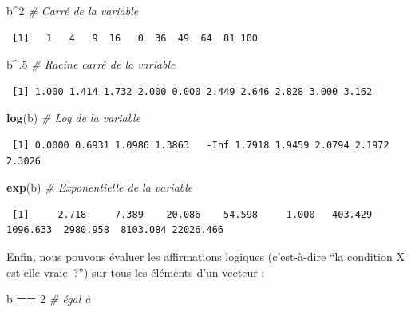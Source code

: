 \documentclass[12pt,]{book}
\newenvironment{Shaded}{\begin{snugshade}}{\end{snugshade}}
\newcommand{\CommentTok}[1]{\textcolor[rgb]{0.56,0.35,0.01}{\textit{#1}}}
\newcommand{\DecValTok}[1]{\textcolor[rgb]{0.00,0.00,0.81}{#1}}
\newcommand{\KeywordTok}[1]{\textcolor[rgb]{0.13,0.29,0.53}{\textbf{#1}}}
\newcommand{\NormalTok}[1]{#1}
\newcommand{\OperatorTok}[1]{\textcolor[rgb]{0.81,0.36,0.00}{\textbf{#1}}}
\newcommand{\StringTok}[1]{\textcolor[rgb]{0.31,0.60,0.02}{#1}}
\begin{document}
\begin{Shaded}
\begin{Highlighting}[]
\NormalTok{b}\OperatorTok{^}\DecValTok{2}               \CommentTok{# Carré de la variable}
\end{Highlighting}
\end{Shaded}

\begin{verbatim}
 [1]   1   4   9  16   0  36  49  64  81 100
\end{verbatim}

\begin{Shaded}
\begin{Highlighting}[]
\NormalTok{b}\OperatorTok{^}\NormalTok{.}\DecValTok{5}              \CommentTok{# Racine carré de la variable}
\end{Highlighting}
\end{Shaded}

\begin{verbatim}
 [1] 1.000 1.414 1.732 2.000 0.000 2.449 2.646 2.828 3.000 3.162
\end{verbatim}

\begin{Shaded}
\begin{Highlighting}[]
\KeywordTok{log}\NormalTok{(b)            }\CommentTok{# Log de la variable}
\end{Highlighting}
\end{Shaded}

\begin{verbatim}
 [1] 0.0000 0.6931 1.0986 1.3863   -Inf 1.7918 1.9459 2.0794 2.1972 2.3026
\end{verbatim}

\begin{Shaded}
\begin{Highlighting}[]
\KeywordTok{exp}\NormalTok{(b)            }\CommentTok{# Exponentielle de la variable}
\end{Highlighting}
\end{Shaded}

\begin{verbatim}
 [1]     2.718     7.389    20.086    54.598     1.000   403.429  1096.633  2980.958  8103.084 22026.466
\end{verbatim}

Enfin, nous pouvons évaluer les affirmations logiques (c'est-à-dire ``la condition X est-elle vraie~?'') sur tous les éléments d'un vecteur :

\begin{Shaded}
\begin{Highlighting}[]
\NormalTok{b }\OperatorTok{==}\StringTok{ }\DecValTok{2}                     \CommentTok{# égal à}
\end{Highlighting}
\end{Shaded}
\end{document}
